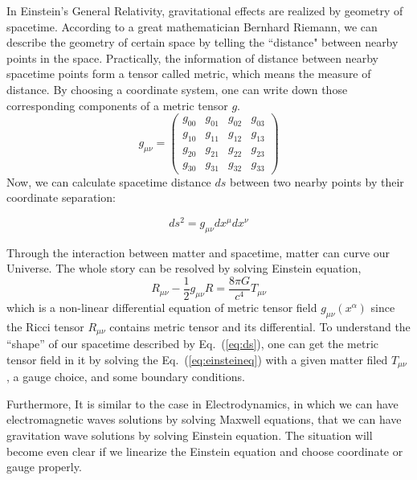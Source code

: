 In Einstein's General Relativity, gravitational effects are realized by geometry of spacetime. According to a great mathematician Bernhard Riemann, we can describe the geometry of certain space by telling the ``distance" between nearby points in the space. Practically, the information of distance between nearby spacetime points form a tensor called metric, which means the measure of distance. By choosing a coordinate system, one can write down those corresponding components of a metric tensor $g$.
\begin{equation}
    g_{\mu\nu}=
\left(
\begin{array}{cccc}
  g_{00} & g_{01} & g_{02} & g_{03} \\
  g_{10} & g_{11} & g_{12} & g_{13} \\
  g_{20} & g_{21} & g_{22} & g_{23} \\
  g_{30} & g_{31} & g_{32} & g_{33}
\end{array}
\right)  
\end{equation}
 Now, we can calculate spacetime distance $ds$ between two nearby points by their coordinate separation:

\begin{equation}
\label{eq:ds}
    ds^2 = g_{\mu\nu} dx^{\mu} dx^{\nu}
\end{equation}



%

Through the interaction between matter and spacetime, matter can curve our Universe. The whole story can be resolved by solving Einstein equation,
\begin{equation}
\label{eq:einsteineq}
    R_{\mu\nu}-\frac{1}{2}g_{\mu\nu}R = \frac{8 \pi G}{c^4} T_{\mu\nu}
\end{equation}
which is a non-linear differential equation of metric tensor field $g_{\mu\nu}(x^{\alpha})$ since the Ricci tensor $R_{\mu\nu}$ contains metric tensor and its differential. To understand the ``shape'' of our spacetime described by Eq.~(\ref{eq:ds}), one can get the metric tensor field in it by solving the Eq.~(\ref{eq:einsteineq}) with a given matter filed $T_{\mu\nu}$ , a gauge choice, and some boundary conditions. 

Furthermore, It is similar to the case in Electrodynamics, in which we can have electromagnetic waves solutions by solving Maxwell equations, that we can have gravitation wave solutions by solving Einstein equation. The situation will become even clear if we linearize the Einstein equation and choose coordinate or gauge properly.

